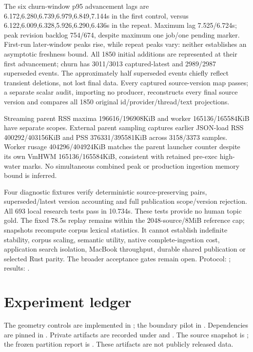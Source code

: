 \documentclass[11pt]{article}
\begin{document}
The six churn-window p95 advancement lags are
6.172,6.280,6.739,6.979,6.849,7.144s in the first control, versus
6.122,6.009,6.328,5.926,6.290,6.436s in the repeat. Maximum lag 7.525/6.724s;
peak revision backlog 754/674, despite maximum one job/one pending marker.
First-run later-window peaks rise, while repeat peaks vary: neither establishes
an asymptotic freshness bound. All 1850 initial additions are represented at
their first advancement; churn has 3011/3013 captured-latest and 2989/2987
superseded events. The approximately half superseded events chiefly reflect
transient deletions, not lost final data. Every captured source-version map passes;
a separate scalar audit, importing no producer, reconstructs every final source
version and compares all 1850 original id/provider/thread/text projections.

Streaming parent RSS maxima 196616/196908KiB and worker 165136/165584KiB have
separate scopes. External parent sampling captures earlier JSON-load
RSS 400292/403156KiB and PSS 376331/395581KiB across 3158/3373 samples. Worker
rusage 404296/404924KiB matches the parent launcher counter despite its own
VmHWM 165136/165584KiB, consistent with retained pre-exec high-water marks.
No simultaneous combined peak or production ingestion memory bound is inferred.

Four diagnostic fixtures verify deterministic source-preserving pairs,
superseded/latest version accounting and full publication scope/version rejection.
All 693 local research tests pass in 10.734s. These tests provide no human topic
gold. The fixed 78.5s replay remains within the 2048-source/8MiB reference cap;
snapshots recompute corpus lexical statistics. It cannot establish indefinite
stability, corpus scaling, semantic utility, native complete-ingestion cost,
application search isolation, MacBook throughput, durable shared publication or
selected Rust parity. The broader acceptance gates remain open.
Protocol: ; results:
.



\appendix
\section{Experiment ledger}
The geometry controls are implemented in ; the
boundary pilot in . Dependencies are pinned in
. Private artifacts are recorded under
 and
. The source snapshot is
; the frozen partition report is
.
These artifacts are not publicly released data.
\end{document}
